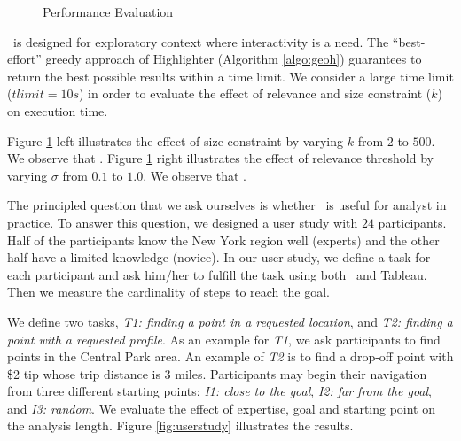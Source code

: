 \begin{figure}
\begin{minipage}[b]{0.45\linewidth}
\end{minipage} 
  
\caption{Performance Evaluation}
\label{fig:performance}
\end{figure}



\vspace{5pt}
 \framework\ is designed for exploratory context where interactivity is a need. The ``best-effort'' greedy approach of {\sc Highlighter} (Algorithm \ref{algo:geoh}) guarantees to return the best possible results within a time limit. We consider a large time limit ($tlimit = 10s$) in order to evaluate the effect of relevance and size constraint ($k$) on execution time.

Figure \ref{fig:performance} left illustrates the effect of size constraint by varying $k$ from $2$ to $500$. We observe that . Figure \ref{fig:performance} right illustrates the effect of relevance threshold by varying $\sigma$ from $0.1$ to $1.0$. We observe that .

\vspace{5pt}
The principled question that we ask ourselves is whether \framework\ is useful for analyst in practice. To answer this question, we designed a user study with $24$ participants. Half of the participants know the New York region well (experts) and the other half have a limited knowledge (novice). In our user study, we define a task for each participant and ask him/her to fulfill the task using both \framework\ and {\sc Tableau}. Then we measure the cardinality of steps to reach the goal.

We define two tasks, {\em T1: finding a point in a requested location}, and {\em T2: finding a point with a requested profile}. As an example for {\em T1}, we ask participants to find points in the Central Park area. An example of {\em T2} is to find a drop-off point with \$2 tip whose trip distance is 3 miles. Participants may begin their navigation from three different starting points: {\em I1: close to the goal}, {\em I2: far from the goal}, and {\em I3: random}. We evaluate the effect of expertise, goal and starting point on the analysis length. Figure \ref{fig:userstudy} illustrates the results.

